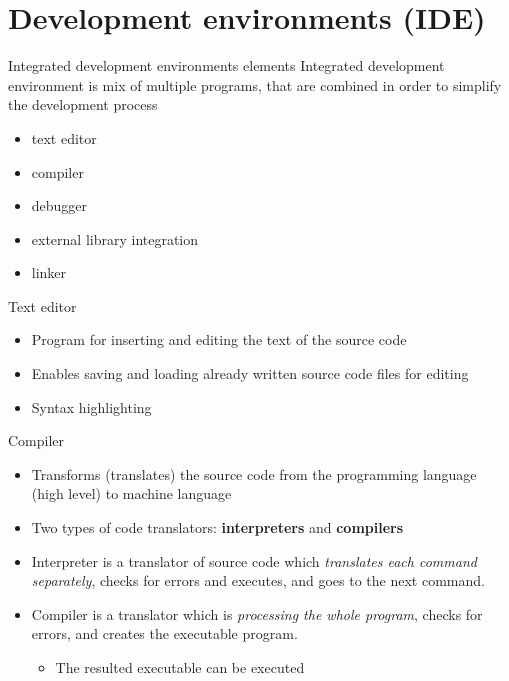 \section{Development environments (IDE)}

\begin{frame}{Integrated development environments elements}
Integrated development environment is mix of multiple programs, that are
combined in order to simplify the development process
\begin{itemize}
  \item text editor
  \item compiler
  \item debugger
  \item external library integration
  \item linker
\end{itemize}
\end{frame}

\begin{frame}{Text editor}
\begin{itemize}
  \item Program for inserting and editing the text of the source code
  \item Enables saving and loading already written source code files
  for editing
  \item Syntax highlighting
\end{itemize}
\end{frame}

\begin{frame}{Compiler}
\begin{itemize}
  \item Transforms (translates) the source code from the programming language
  (high level) to machine language
  \item Two types of code translators:
  \textbf{interpreters} and \textbf{compilers}
  \item Interpreter is a translator of source code which \emph{translates each
  command separately}, checks for errors and executes, and goes to the next
  command.
  \item Compiler is a translator which is \emph{processing the whole
  program}, checks for errors, and creates the executable program.
  \begin{itemize}
  \item The resulted executable can be executed
  \end{itemize}
\end{itemize}
\end{frame}

